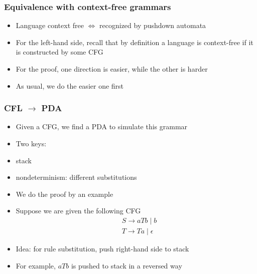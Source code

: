 




\begin{frame}[allowframebreaks] \frametitle{Equivalence with context-free grammars}
  \begin{itemize}  
\item Language context free
$\Leftrightarrow$ recognized by pushdown automata

\item For the left-hand side, recall that by definition a language is context-free if
  it is constructed by some CFG
\item For the proof, one direction is easier, while the other is harder
\item As usual, we do the easier one first
  
\end{itemize}\end{frame} \begin{frame}[allowframebreaks] \frametitle{CFL $\rightarrow$ PDA}
    \begin{itemize}
    \item Given a CFG, we find a PDA to simulate this grammar
      
\item Two keys:

\item [] stack 

\item [] nondeterminism: different substitutions

  
\item We do the proof by an example
\item Suppose we are given the following
  CFG
  \begin{equation*}
    \begin{split}
      & S \rightarrow aTb \mid b\\
      & T \rightarrow Ta \mid \epsilon
    \end{split}
  \end{equation*}

\item Idea: for rule substitution, push right-hand side to stack

\item [] For example, $aTb$ is pushed to stack in a reversed way


\end{itemize}
\end{frame}
